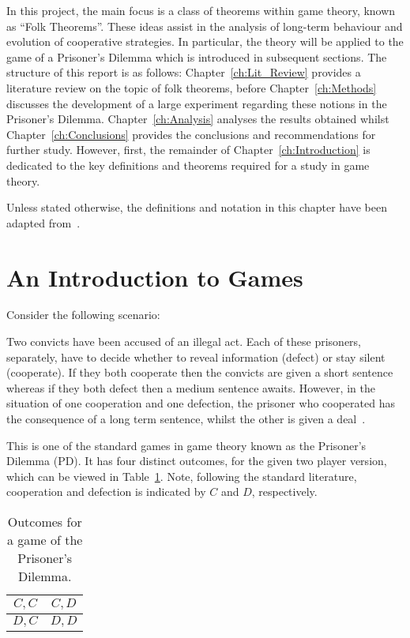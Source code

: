 In this project, the main focus is a
class of theorems within game theory, known as ``Folk Theorems''. These ideas
assist in the analysis of long-term behaviour and evolution of cooperative
strategies. In particular, the theory will be applied to the game of a
Prisoner's Dilemma which is introduced in subsequent sections. The structure of
this report is as follows: Chapter~\ref{ch:Lit_Review} provides a literature review
on the topic of folk theorems, before Chapter~\ref{ch:Methods} discusses the
development of a large experiment regarding these notions in the Prisoner's
Dilemma. Chapter~\ref{ch:Analysis} analyses the results obtained
whilst Chapter~\ref{ch:Conclusions} provides the conclusions and recommendations for
further study. However, first, the remainder of Chapter~\ref{ch:Introduction} is dedicated
to the key definitions and theorems required for a study in game theory.

Unless stated otherwise, the definitions and notation in this chapter have been
adapted from~\cite{maschler_solan_zamir_2013}.

\section{An Introduction to Games}\label{sec:An_Intro_to_Games}
Consider the following scenario:

\begin{center}
    Two convicts have been accused of an illegal act. Each of these prisoners,
    separately, have to decide whether to reveal information (defect) or stay
    silent (cooperate). If they both cooperate then the convicts are given a
    short sentence whereas if they both defect then a medium sentence awaits.
    However, in the situation of one cooperation and one defection, the prisoner
    who cooperated has the consequence of a long term sentence, whilst the other
    is given a deal~\cite{Knight2017, maschler_solan_zamir_2013}.
\end{center}

This is one of the standard games in game theory known as the Prisoner's
Dilemma (PD). It has four distinct outcomes, for the given two player version,
which can be viewed in Table~\ref{tab:PD_outcomes}. Note, following the standard
literature, cooperation and defection is indicated by \(C\) and \(D\), respectively.

\begin{table}
    \centering
    \begin{tabular}{c|c}
        \(C, C\) & \(C, D\) \\
        \midrule
        \(D, C\) & \(D, D\) \\
    \end{tabular}
    \caption{Outcomes for a game of the Prisoner's Dilemma.}\label{tab:PD_outcomes}
\end{table}

